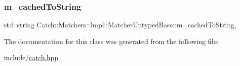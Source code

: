\subsubsection{\texorpdfstring{m\+\_\+cached\+To\+String}{m\_cachedToString}}
{\footnotesize\ttfamily std\+::string Catch\+::\+Matchers\+::\+Impl\+::\+Matcher\+Untyped\+Base\+::m\+\_\+cached\+To\+String\hspace{0.3cm}{\ttfamily [mutable]}, {\ttfamily [protected]}}



The documentation for this class was generated from the following file\+:\begin{DoxyCompactItemize}
\item 
include/\mbox{\hyperlink{catch_8hpp}{catch.\+hpp}}\end{DoxyCompactItemize}
